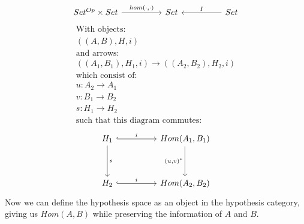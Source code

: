 \documentclass{article}
\theoremstyle{definition}
\begin{document}
\[\begin{tikzcd}
	{Set^{Op} \times Set} && Set && Set
	\arrow["{hom(\cdot, \cdot)}", from=1-1, to=1-3]
	\arrow["I"', from=1-5, to=1-3]
\end{tikzcd}\]
\begin{gather*}
    \text{With objects: } \\
    ((A,B), H, i) \\
    \text{and arrows: }  \\
	{((A_1,B_1), H_1, i)} \rightarrow  {((A_2,B_2), H_2, i)} \\
    \text{which consist of: }  \\
    u: A_2 \rightarrow A_1 \\
    v: B_1 \rightarrow B_2 \\
    s: H_1 \rightarrow H_2 \\
    \text{such that this diagram commutes: }
\end{gather*}
\[\begin{tikzcd}
	{H_1} && {Hom(A_1,B_1)} \\
	\\
	{H_2} && {Hom(A_2,B_2)}
	\arrow["s", from=1-1, to=3-1]
	\arrow["i", hook, from=1-1, to=1-3]
	\arrow["i", hook, from=3-1, to=3-3]
	\arrow["{(u, v)^*}"', from=1-3, to=3-3]
\end{tikzcd}\]
Now we can define the hypothesis space as an object in the hypothesis category, giving us $Hom(A,B)$ while preserving the information of $A$ and $B$.
\end{document}
